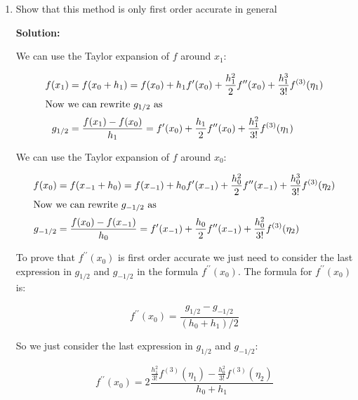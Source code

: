 \documentclass[12pt]{article}
\newcommand{\pprime}{\prime \prime}
\begin{document}
\begin{enumerate}
\begin{enumerate}
{\bf Solution:}

\begin{align*}
f^{\pprime}(x_{0}) &= \frac{g_{1/2} - g_{-1/2}}{(h_{0} + h_{1})/2} = \frac{\frac{f(x_{1}) - f(x_{0})}{x_{1} - x_{0}} - \frac{f(x_{0}) - f(x_{-1})}{x_{0} - x_{-1}}}{\frac{x_{1} - x_{-1}}{2}}\\
&= \frac{\frac{f(x_{1}) - f(x_{0})}{x_{1} - x_{0}} - \frac{f(x_{0}) - f(x_{-1})}{x_{0} - x_{-1}}}{x_{1} - x_{-1}} = 2f[x_{-1}, x_{0}, x_{1}]
\end{align*}

\item Show that this method is only first order accurate in general

{\bf Solution:}

We can use the Taylor expansion of $f$ around $x_{1}$:

\begin{align*}
f(x_{1}) &= f(x_{0} + h_{1}) = f(x_{0}) + h_{1}f^{\prime}(x_{0}) + \frac{h_{1}^{2}}{2}f^{\pprime}(x_{0}) + \frac{h_{1}^{3}}{3!}f^{(3)}(\eta_{1})\\
\intertext{Now we can rewrite $g_{1/2}$ as}
g_{1/2} &= \frac{f(x_{1}) - f(x_{0})}{h_{1}} = f^{\prime}(x_{0}) + \frac{h_{1}}{2}f^{\pprime}(x_{0}) + \frac{h_{1}^{2}}{3!}f^{(3)}(\eta_{1})
\end{align*}

We can use the Taylor expansion of $f$ around $x_{0}$:

\begin{align*}
f(x_{0}) &= f(x_{-1} + h_{0}) = f(x_{-1}) + h_{0}f^{\prime}(x_{-1}) + \frac{h_{0}^{2}}{2}f^{\pprime}(x_{-1}) + \frac{h_{0}^{3}}{3!}f^{(3)}(\eta_{2})\\
\intertext{Now we can rewrite $g_{-1/2}$ as}
g_{-1/2} &= \frac{f(x_{0}) - f(x_{-1})}{h_{0}} = f^{\prime}(x_{-1}) + \frac{h_{0}}{2}f^{\pprime}(x_{-1}) + \frac{h_{0}^{2}}{3!}f^{(3)}(\eta_{2})
\end{align*}

To prove that $f^{\pprime}(x_{0})$ is first order accurate we just need to consider the last expression in $g_{1/2}$ and $g_{-1/2}$ in the formula $f^{\pprime}(x_{0})$. The formula for $f^{\pprime}(x_{0})$ is:

\[
f^{\pprime}(x_{0}) = \frac{g_{1/2} - g_{-1/2}}{(h_{0} + h_{1})/2}
\]

So we just consider the last expression in $g_{1/2}$ and $g_{-1/2}$:

\[
f^{\pprime}(x_{0}) = 2\frac{\frac{h_{1}^{2}}{3!}f^{(3)}(\eta_{1}) - \frac{h_{0}^{2}}{3!}f^{(3)}(\eta_{2})}{h_{0} + h_{1}}
\]


\end{enumerate}
\end{enumerate}
\end{document}
